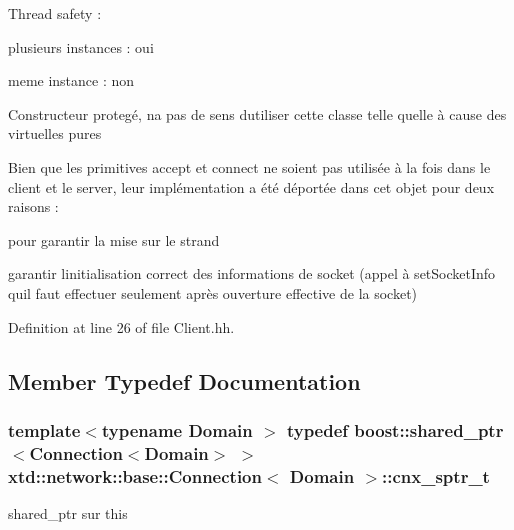 \begin{DoxyItemize}
\item Thread safety \+:
\begin{DoxyItemize}
\item plusieurs instances \+: oui
\item meme instance \+: non
\end{DoxyItemize}
\item Constructeur protegé, n\textquotesingle{}a pas de sens d\textquotesingle{}utiliser cette classe telle quelle à cause des virtuelles pures
\item Bien que les primitives accept et connect ne soient pas utilisée à la fois dans le client et le server, leur implémentation a été déportée dans cet objet pour deux raisons \+:
\begin{DoxyItemize}
\item pour garantir la mise sur le strand
\item garantir l\textquotesingle{}initialisation correct des informations de socket (appel à set\+Socket\+Info qu\textquotesingle{}il faut effectuer seulement après ouverture effective de la socket) 
\end{DoxyItemize}
\end{DoxyItemize}

Definition at line 26 of file Client.\+hh.



\subsection{Member Typedef Documentation}
\subsubsection[{\texorpdfstring{cnx\+\_\+sptr\+\_\+t}{cnx_sptr_t}}]{\setlength{\rightskip}{0pt plus 5cm}template$<$typename Domain $>$ typedef boost\+::shared\+\_\+ptr$<${\bf Connection}$<$Domain$>$ $>$ {\bf xtd\+::network\+::base\+::\+Connection}$<$ Domain $>$\+::{\bf cnx\+\_\+sptr\+\_\+t}}\hypertarget{classxtd_1_1network_1_1base_1_1Connection_a10f05cd689d67b012768c79486c6df47}{}\label{classxtd_1_1network_1_1base_1_1Connection_a10f05cd689d67b012768c79486c6df47}


shared\+\_\+ptr sur this 



